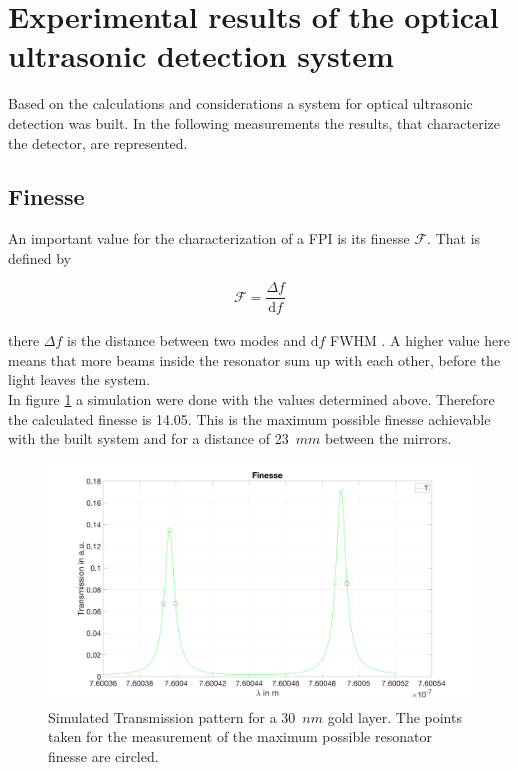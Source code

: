 \section{Experimental results of the optical ultrasonic detection system}
\label{sec:OUSDresults}
Based on the calculations and considerations a system for optical ultrasonic detection was built. In the following measurements the results, that characterize the detector, are represented.

\subsection{Finesse}

An important value for the characterization of a FPI is its finesse $\mathcal{F}$. That is defined by

\begin{equation}
\mathcal{F} = \frac{\Delta f}{\mathrm{d} f}
\label{eq:finesse}
\end{equation}
\\
there $\Delta f$ is the distance between two modes and $\mathrm{d} f$ FWHM \cite{eichler:laser}. A higher value here means that more beams inside the resonator sum up with each other, before the light leaves the system.\\
In figure \ref{fig:finesseSimMax} a simulation were done with the values determined above. Therefore the calculated finesse is 14.05. This is the maximum possible finesse achievable with the built system and for a distance of 23~$mm$ between the mirrors.  

\begin{figure}[H]			
	\includegraphics[width = \textwidth, height=0.35\textheight]{06_ex-results_of_OUSD/images/calcFinesse.png}
	\caption{Simulated Transmission pattern for a 30~$nm$ gold layer. The points taken for the measurement of the maximum possible resonator finesse are circled.}
	\label{fig:finesseSimMax}
\end{figure}

